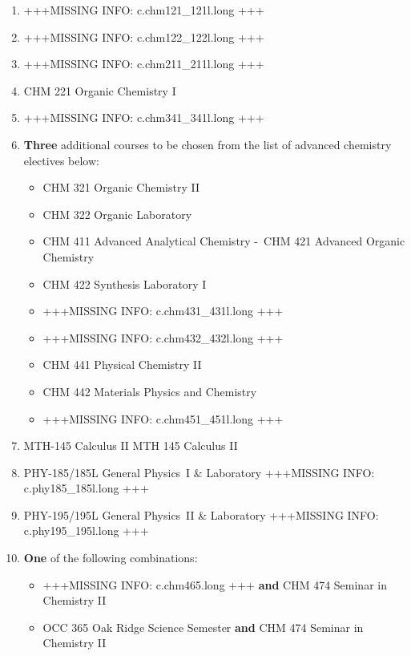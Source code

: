 \documentclass[
  letterpaper,
]{scrbook}
\providecommand{\tightlist}{%
  \setlength{\itemsep}{0pt}\setlength{\parskip}{0pt}}
\begin{document}
\begin{enumerate}
\def\labelenumi{\arabic{enumi}.}
\item
  +++MISSING INFO: c.chm121\_121l.long +++
\item
  +++MISSING INFO: c.chm122\_122l.long +++
\item
  +++MISSING INFO: c.chm211\_211l.long +++
\item
  CHM 221 Organic Chemistry I
\item
  +++MISSING INFO: c.chm341\_341l.long +++
\item
  \textbf{Three} additional courses to be chosen from the list of
  advanced chemistry electives below:

  \begin{itemize}
  \tightlist
  \item
    CHM 321 Organic Chemistry II
  \item
    CHM 322 Organic Laboratory
  \item
    CHM 411 Advanced Analytical Chemistry -~CHM 421 Advanced Organic
    Chemistry
  \item
    CHM 422 Synthesis Laboratory I
  \item
    +++MISSING INFO: c.chm431\_431l.long +++
  \item
    +++MISSING INFO: c.chm432\_432l.long +++
  \item
    CHM 441 Physical Chemistry II
  \item
    CHM 442 Materials Physics and Chemistry
  \item
    +++MISSING INFO: c.chm451\_451l.long +++
  \end{itemize}
\item
  MTH-145 Calculus II MTH 145 Calculus II
\item
  PHY-185/185L General Physics~I \& Laboratory +++MISSING INFO:
  c.phy185\_185l.long +++
\item
  PHY-195/195L General Physics~II \& Laboratory +++MISSING INFO:
  c.phy195\_195l.long +++
\item
  \textbf{One} of the following combinations:

  \begin{itemize}
  \tightlist
  \item
    +++MISSING INFO: c.chm465.long +++ \textbf{and} CHM 474 Seminar in
    Chemistry II
  \item
    OCC 365 Oak Ridge Science Semester \textbf{and} CHM 474 Seminar in
    Chemistry II
  \end{itemize}
\end{enumerate}
\end{document}
